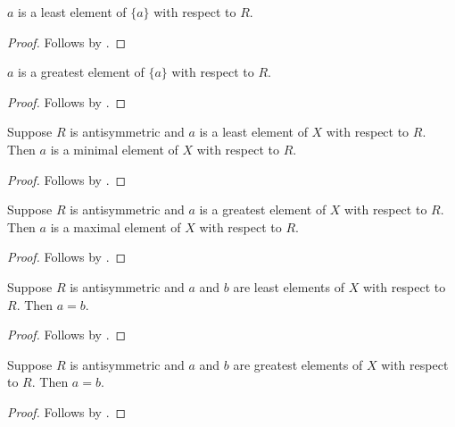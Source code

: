\begin{proposition}\label{singleton_least_element}
    $a$ is a least element of $\{a\}$ with respect to $R$.
\end{proposition}
\begin{proof}
    Follows by .
\end{proof}

\begin{proposition}\label{singleton_greatest_element}
    $a$ is a greatest element of $\{a\}$ with respect to $R$.
\end{proposition}
\begin{proof}
    Follows by .
\end{proof}

\begin{proposition}\label{least_element_is_minimal}
    Suppose $R$ is antisymmetric and
        $a$ is a least element of $X$ with respect to $R$.
    Then $a$ is a minimal element of $X$ with respect to $R$.
\end{proposition}
\begin{proof}
    Follows by .
\end{proof}

\begin{proposition}\label{greatest_element_is_maximal}
    Suppose $R$ is antisymmetric and
        $a$ is a greatest element of $X$ with respect to $R$.
    Then $a$ is a maximal element of $X$ with respect to $R$.
\end{proposition}
\begin{proof}
    Follows by .
\end{proof}

\begin{proposition}\label{least_element_unique}
    Suppose $R$ is antisymmetric and
        $a$ and $b$ are least elements of $X$ with respect to $R$.
    Then $a=b$.
\end{proposition}
\begin{proof}
    Follows by .
\end{proof}

\begin{proposition}\label{greatest_element_unique}
    Suppose $R$ is antisymmetric and
        $a$ and $b$ are greatest elements of $X$ with respect to $R$.
    Then $a=b$.
\end{proposition}
\begin{proof}
    Follows by .
\end{proof}
